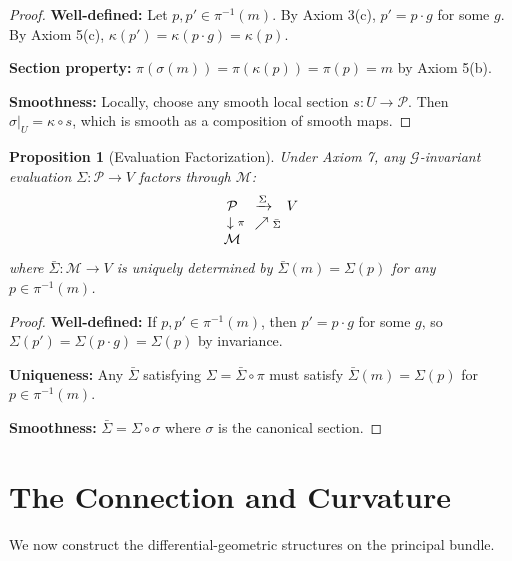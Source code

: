 \documentclass[11pt]{article}
\newtheorem{proposition}[theorem]{Proposition}
\begin{document}
\begin{proof}
\textbf{Well-defined:} Let $p, p' \in \pi^{-1}(m)$. By Axiom 3(c), $p' = p \cdot g$ for some $g$. By Axiom
5(c), $\kappa(p') = \kappa(p \cdot g) = \kappa(p)$.

\textbf{Section property:} $\pi(\sigma(m)) = \pi(\kappa(p)) = \pi(p) = m$ by Axiom 5(b).

\textbf{Smoothness:} Locally, choose any smooth local section $s : U \to \mathcal{P}$. Then $\sigma|_U = \kappa \circ s$, which
is smooth as a composition of smooth maps.
\end{proof}

\begin{proposition}[Evaluation Factorization]
\label{prop:factorization}
Under Axiom 7, any $\mathcal{G}$-invariant evaluation $\Sigma :
\mathcal{P} \to V$ factors through $\mathcal{M}$:
\[
\begin{array}{ccc}
\mathcal{P} & \xrightarrow{\Sigma} & V \\
\downarrow\vcenter{\rlap{$\scriptstyle\pi$}} & \nearrow\vcenter{\rlap{$\scriptstyle\bar{\Sigma}$}} & \\
\mathcal{M} & &
\end{array}
\]
where $\bar{\Sigma} : \mathcal{M} \to V$ is uniquely determined by $\bar{\Sigma}(m) = \Sigma(p)$ for any $p \in \pi^{-1}(m)$.
\end{proposition}

\begin{proof}
\textbf{Well-defined:} If $p, p' \in \pi^{-1}(m)$, then $p' = p \cdot g$ for some $g$, so $\Sigma(p') = \Sigma(p \cdot g) = \Sigma(p)$
by invariance.

\textbf{Uniqueness:} Any $\bar{\Sigma}$ satisfying $\Sigma = \bar{\Sigma} \circ \pi$ must satisfy $\bar{\Sigma}(m) = \Sigma(p)$ for $p \in \pi^{-1}(m)$.

\textbf{Smoothness:} $\bar{\Sigma} = \Sigma \circ \sigma$ where $\sigma$ is the canonical section.
\end{proof}

\section{The Connection and Curvature}

We now construct the differential-geometric structures on the principal bundle.
\end{document}
